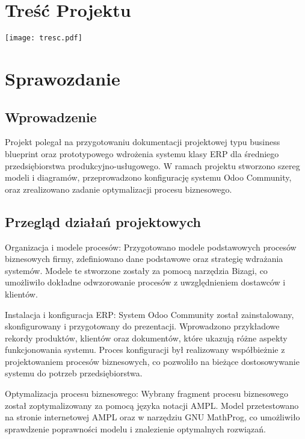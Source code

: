 \section{Treść Projektu}

\texttt{[image: tresc.pdf]}\\[0.5cm]

\section{Sprawozdanie}

\subsection{Wprowadzenie}

Projekt polegał na przygotowaniu dokumentacji projektowej typu business blueprint oraz prototypowego wdrożenia systemu klasy ERP dla średniego przedsiębiorstwa produkcyjno-usługowego. W ramach projektu stworzono szereg modeli i diagramów, przeprowadzono konfigurację systemu Odoo Community, oraz zrealizowano zadanie optymalizacji procesu biznesowego.

\subsection{Przegląd działań projektowych}

Organizacja i modele procesów:
Przygotowano modele podstawowych procesów biznesowych firmy, zdefiniowano dane podstawowe oraz strategię wdrażania systemów. Modele te stworzone zostały za pomocą narzędzia Bizagi\citep{bizagi}, co umożliwiło dokładne odwzorowanie procesów z uwzględnieniem dostawców i klientów.

Instalacja i konfiguracja ERP:
System Odoo Community\citep{odoo} został zainstalowany, skonfigurowany i przygotowany do prezentacji. Wprowadzono przykładowe rekordy produktów, klientów oraz dokumentów, które ukazują różne aspekty funkcjonowania systemu. Proces konfiguracji był realizowany współbieżnie z projektowaniem procesów biznesowych, co pozwoliło na bieżące dostosowywanie systemu do potrzeb przedsiębiorstwa.

Optymalizacja procesu biznesowego:
Wybrany fragment procesu biznesowego został zoptymalizowany za pomocą języka notacji AMPL\cite{ampl}. Model przetestowano na stronie internetowej AMPL oraz w narzędziu GNU MathProg, co umożliwiło sprawdzenie poprawności modelu i znalezienie optymalnych rozwiązań.

